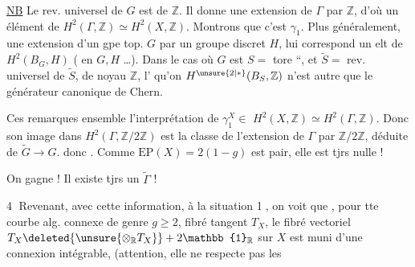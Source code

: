 \uline{NB} Le rev. universel de $G$ est de  $\mathbb Z$. Il donne une extension  de $\Gamma$ par $\mathbb Z$, d'où un élément de $H^2(\Gamma,\mathbb Z)\simeq H^2(X,\mathbb Z)$. Montrons que c'est $\gamma_1$. Plus généralement,  une extension d'un gpe top. $G$ par un groupe discret $H$, lui correspond un elt de $H^2(B_G,H)$ ( en $G,H$ \ldots).
Dans le cas où $G$ est $S=$ tore ``, et $\widetilde S=$ rev. universel de $\widetilde S$, de noyau $\mathbb Z$, l' qu'on   $H^{\unsure{2|*}}(B_S,\mathbb Z)$ n'est autre que le générateur canonique de Chern.

Ces remarques ensemble   l'interprétation  de $\gamma_1^X\in$  $H^2(X,\mathbb Z)\simeq H^2(\Gamma,\mathbb Z)$. Donc son image dans $H^2(\Gamma,\mathbb Z/2\mathbb Z)$  est la classe de l'extension de $\Gamma$ par $\mathbb Z/2\mathbb Z$, déduite de $\widetilde G\longrightarrow G$.  donc   . Comme $\mathrm{EP}(X)=2(1-g)$ est pair, elle est tjrs nulle !

On gagne ! Il existe tjrs un $\widetilde\Gamma$ !

\textcircled{4} Revenant, avec cette information, à la situation \textcircled{1}, on voit que , pour tte courbe alg.  connexe de genre $g\geq2$, fibré tangent $T_X$, le fibré vectoriel  $T_X\deleted{\unsure{\otimes_{\mathbb R}T_X}}+2\mathbb{1}_{\mathbb R}$ sur $X$ est muni d'une connexion intégrable, (attention, elle ne respecte pas les
